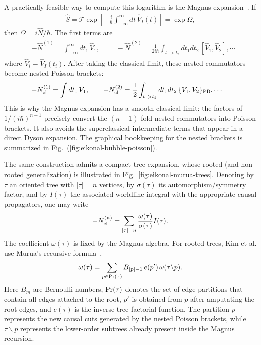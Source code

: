 {A practically feasible way to compute this logarithm is the Magnus expansion~\cite{Magnus:1954,Kim:2024svw}. If
\begin{align}
    \widehat S
    =
    \mathcal T
    \exp\!\left[
      -\frac{i}{\hbar}
      \int_{-\infty}^{\infty}
      dt\,\widehat V_I(t)
    \right]
    =
    \exp\Omega,
\end{align}
then \(\Omega=i\widehat N/\hbar\). The first terms are
\begin{align}
\begin{split}
   & -\widehat N^{(1)}
    =
    \int_{-\infty}^{\infty}
    dt_1\,\widehat V_1,\,\,\qquad
    -\widehat N^{(2)}
    =
    \frac{1}{2i\hbar}
    \int_{t_1>t_2}
    dt_1dt_2\,
    [\widehat V_1,\widehat V_2],\cdots
\end{split}
\end{align}
where \(\widehat V_i\equiv \widehat V_I(t_i)\). After taking the classical limit, these nested commutators become nested Poisson brackets:
\begin{align}
\begin{split}
    -N_{\rm cl}^{(1)}
    &=
    \int dt_1\,V_1,\qquad
    -N_{\rm cl}^{(2)}
    =
    \frac{1}{2}
    \int_{t_1>t_2}
    dt_1dt_2\,
    \{V_1,V_2\}_{\rm PB},\cdots
\end{split}
\end{align}
This is why the Magnus expansion has a smooth classical limit: the factors of \(1/(i\hbar)^{n-1}\) precisely convert the \((n-1)\)-fold nested commutators into Poisson brackets. It also avoids the superclassical intermediate terms that appear in a direct Dyson expansion. The graphical bookkeeping for the nested brackets is summarized in Fig.~(\ref{fig:eikonal-bubble-poisson}).

The same construction admits a compact tree expansion, whose rooted (and non-rooted generalization) is illustrated in Fig.~\eqref{fig:eikonal-murua-trees}. Denoting by \(\tau\) an oriented tree with \(|\tau|=n\) vertices, by \(\sigma(\tau)\) its automorphism/symmetry factor, and by \(I(\tau)\) the associated worldline integral with the appropriate causal propagators, one may write
\begin{align}
    -N_{\rm cl}^{(n)}
    =
    \sum_{|\tau|=n}
    \frac{\omega(\tau)}{\sigma(\tau)}
    I(\tau).
\end{align}
The coefficient \(\omega(\tau)\) is fixed by the Magnus algebra. For rooted trees, Kim et al. use Murua's recursive formula~\cite{Murua:2006,Kim:2024svw},
\begin{align}
    \omega(\tau)
    =
    \sum_{p\in {\rm Pr}(\tau)}
    B_{|p|-1}\,
    e(p')\,
    \omega(\tau\backslash p).
\end{align}
Here \(B_m\) are Bernoulli numbers, \({\rm Pr}(\tau)\) denotes the set of edge partitions that contain all edges attached to the root, \(p'\) is obtained from \(p\) after amputating the root edges, and \(e(\tau)\) is the inverse tree-factorial function. The partition \(p\) represents the new causal cuts generated by the nested Poisson brackets, while \(\tau\backslash p\) represents the lower-order subtrees already present inside the Magnus recursion.

}
